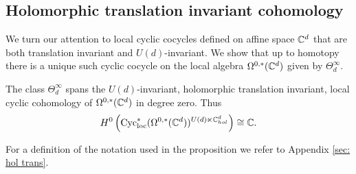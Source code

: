 \subsection{Holomorphic translation invariant cohomology}

We turn our attention to local cyclic cocycles defined on affine space $\mathbb C^d$ that are both translation invariant and $U(d)$-invariant. 
We show that up to homotopy there is a unique such cyclic cocycle on the local algebra  $\Omega^{0,*}(\mathbb C^d)$ given by $\Theta^\infty_d$. 

\begin{prop}\label{prop: cyctrans}
The class $\Theta^\infty_d$ spans the $U(d)$-invariant, holomorphic translation invariant, local cyclic cohomology of $\Omega^{0,*}(\mathbb C^d)$ in degree zero.
Thus
\[
H^0\left({\rm Cyc}_{\rm loc}^*(\Omega^{0,*}(\mathbb C^d))^{U(d) \ltimes \mathbb C^d_{hol}} \right) \cong \mathbb C .
\] 
\end{prop}

For a definition of the notation used in the proposition we refer to Appendix \ref{sec: hol trans}.


